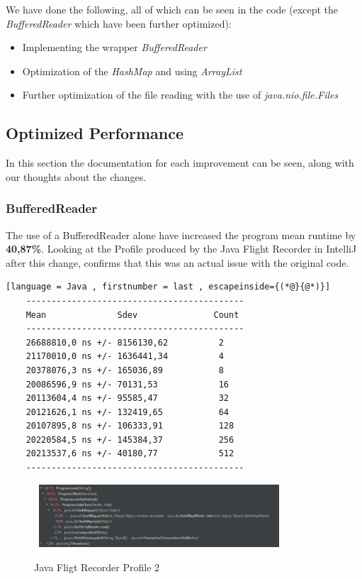 We have done the following, all of which can be seen in the code (except the \emph{BufferedReader} which have been further optimized):
\begin{itemize}
    \item Implementing the wrapper \emph{BufferedReader}
    \item Optimization of the \emph{HashMap} and using \emph{ArrayList}
    \item Further optimization of the file reading with the use of \emph{java.nio.file.Files}
\end{itemize}


\subsection{Optimized Performance}
\label{sec:2.6}
In this section the documentation for each improvement can be seen, along with our thoughts about the changes. 
\subsubsection{BufferedReader}
\label{sec:2.6.1}
The use of a BufferedReader alone have increased the program mean runtime by \textbf{40,87\%}. Looking at the Profile produced by the Java Flight Recorder in IntelliJ after this change, confirms that this was an actual issue with the original code.
\begin{lstlisting}[language = Java , firstnumber = last , escapeinside={(*@}{@*)}]
    -------------------------------------------
    Mean              Sdev               Count
    -------------------------------------------
    26688810,0 ns +/- 8156130,62          2
    21170010,0 ns +/- 1636441,34          4
    20378076,3 ns +/- 165036,89           8
    20086596,9 ns +/- 70131,53            16
    20113604,4 ns +/- 95585,47            32
    20121626,1 ns +/- 132419,65           64
    20107895,8 ns +/- 106333,91           128
    20220584,5 ns +/- 145384,37           256
    20213537,6 ns +/- 40180,77            512
    -------------------------------------------
\end{lstlisting}

\begin{figure}[H]
    \centering\
    \includegraphics[width = 0.8\textwidth ]{figures/profile2.PNG}
    \caption{Java Fligt Recorder Profile 2}
    \label{fig:p2}
\end{figure}

